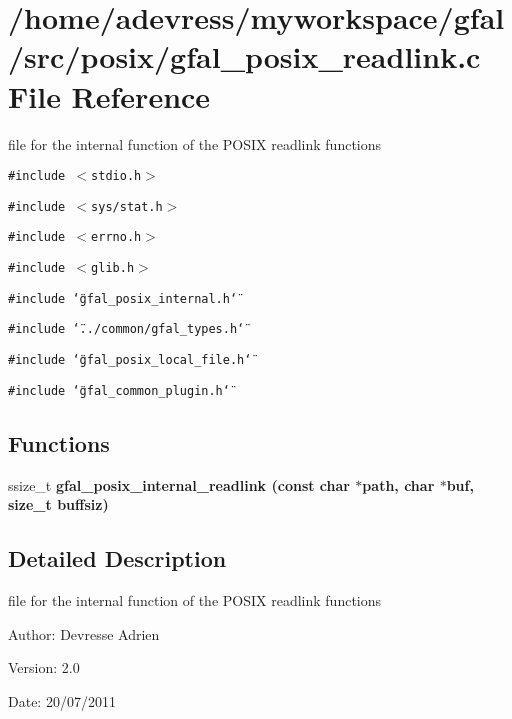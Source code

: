 \section{/home/adevress/myworkspace/gfal/src/posix/gfal\_\-posix\_\-readlink.c File Reference}
\label{gfal__posix__readlink_8c}
file for the internal function of the POSIX readlink functions 

{\tt \#include $<$stdio.h$>$}\par
{\tt \#include $<$sys/stat.h$>$}\par
{\tt \#include $<$errno.h$>$}\par
{\tt \#include $<$glib.h$>$}\par
{\tt \#include \char`\"{}gfal\_\-posix\_\-internal.h\char`\"{}}\par
{\tt \#include \char`\"{}../common/gfal\_\-types.h\char`\"{}}\par
{\tt \#include \char`\"{}gfal\_\-posix\_\-local\_\-file.h\char`\"{}}\par
{\tt \#include \char`\"{}gfal\_\-common\_\-plugin.h\char`\"{}}\par
\subsection*{Functions}
\begin{CompactItemize}
\item 
ssize\_\-t \bf{gfal\_\-posix\_\-internal\_\-readlink} (const char $\ast$path, char $\ast$buf, size\_\-t buffsiz)
\end{CompactItemize}


\subsection{Detailed Description}
file for the internal function of the POSIX readlink functions 

\begin{Desc}
\item[Author:]Devresse Adrien \end{Desc}
\begin{Desc}
\item[Version:]2.0 \end{Desc}
\begin{Desc}
\item[Date:]20/07/2011 \end{Desc}


